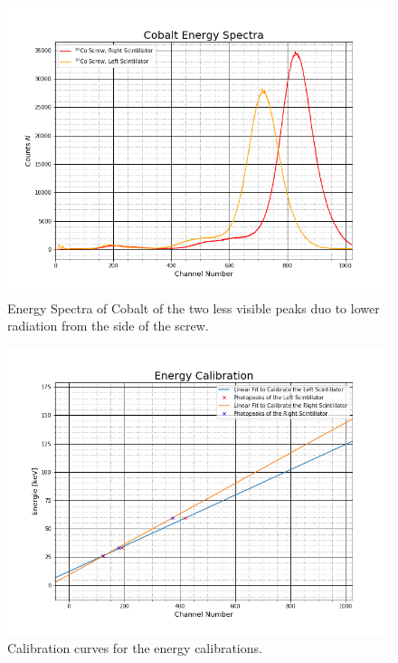 \documentclass[30pt,a4paper]{article}
\begin{document}
	\begin{figure}[h]
		\includegraphics[scale=0.5]{Bilder/Cobalt_Energy_Spectra2}
		\centering
		\caption[Cobalt Spectrum less visible Peaks]{Energy Spectra of Cobalt of the two less visible peaks duo to lower radiation from the side of the screw.}
		\label{2cobaltspectra}
	\end{figure}
	\begin{figure}[h]
		\includegraphics[scale=0.5]{Bilder/EnergyCalib}
		\centering
		\caption[Energy Calibration Curves]{Calibration curves for the energy calibrations.}
		\label{EnergieCalib}
	\end{figure}
\end{document}
